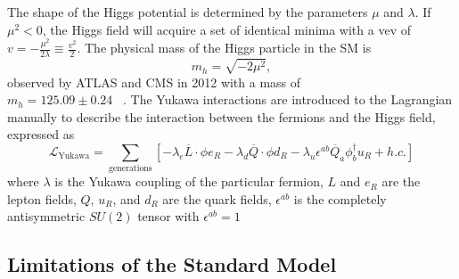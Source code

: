 The shape of the Higgs potential is determined by the parameters $\mu$ and $\lambda$. 
If $\mu^2 < 0$, the Higgs field will acquire a set of identical minima with a vev of 
$v=-\frac{\mu^2}{2\lambda} \equiv \frac{v^2}{2}$. The physical mass of the Higgs particle in the SM is
\begin{equation}
m_h = \sqrt{-2\mu^2},
\label{eq:theory.sm.mh}
\end{equation}
observed by ATLAS and CMS in 2012 with a mass of \\
$m_h = 125.09 \pm 0.24$ \GeV~\cite{atlas_higgs,cms_higgs}.
The Yukawa interactions are introduced to the Lagrangian manually to describe the interaction between the fermions and the Higgs field, 
expressed as 
\begin{equation}
 \mathcal{L}_\text{Yukawa} = \sum_\text{generations} \left[-\lambda_e \overline{L} \cdot \phi e_R - \lambda_d \overline{Q} \cdot \phi d_R 
 - \lambda_u \epsilon^{ab} \overline{Q}_a \phi_b^{\dagger} u_R + h.c. \right]
\end{equation}
where $\lambda$ is the Yukawa coupling of the particular fermion, $L$ and $e_R$ are the lepton fields, 
$Q$, $u_R$, and $d_R$ are the quark fields, $\epsilon^{ab} $ is the completely antisymmetric  $ SU\left(2\right) $ tensor with $\epsilon^{ab} = 1$


\subsection{Limitations of the Standard Model}

